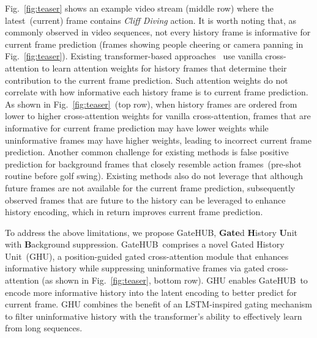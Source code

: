 \documentclass[10pt,twocolumn,letterpaper]{article}
\newcommand{\methodname}{GateHUB}
\begin{document}
Fig.~\ref{fig:teaser} shows an example video stream (middle row) where the latest~(current) frame contains \textit{Cliff Diving} action. It is worth noting that, as commonly observed in video sequences, not every history frame is informative for current frame prediction (\eg frames showing people cheering or camera panning in Fig.~\ref{fig:teaser}).
Existing transformer-based approaches~\cite{xu2021long} use vanilla cross-attention to learn attention weights for history frames that determine their contribution to the current frame prediction. Such attention weights do not correlate with how informative each history frame is to current frame prediction.
As shown in Fig.~\ref{fig:teaser}~(top row), when history frames are ordered from lower to higher cross-attention weights for vanilla cross-attention, frames that are informative for current frame prediction may have lower weights while uninformative frames may have higher weights, leading to incorrect current frame prediction. Another common challenge for existing methods is false positive prediction for background frames that closely resemble action frames~(\eg pre-shot routine before golf swing). 
Existing methods also do not leverage that although future frames are not available for the current frame prediction, subsequently observed frames that are future to the history can be leveraged to enhance history encoding, which in return improves current frame prediction.








To address the above limitations, we propose \methodname, \textbf{Gate}d \textbf{H}istory \textbf{U}nit with \textbf{B}ackground suppression. \methodname~comprises a novel Gated History Unit~(GHU), a position-guided gated cross-attention module that enhances informative history while suppressing uninformative frames via gated cross-attention (as shown in Fig.~\ref{fig:teaser}, bottom row). GHU enables \methodname~to encode more informative history into the latent encoding to better predict for current frame. GHU combines the benefit of an LSTM-inspired gating mechanism to filter uninformative history with the transformer’s ability to effectively learn from long sequences.
\end{document}

